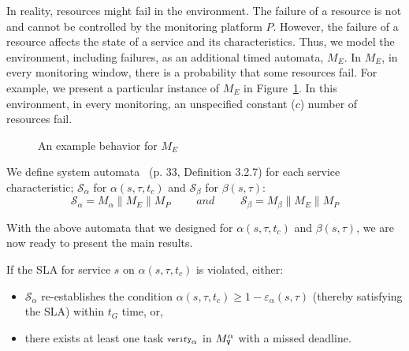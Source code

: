 In reality, resources might fail in the environment.
The failure of a resource is not and cannot be controlled by the monitoring platform $P$.
However, the failure of a resource affects the state of a service and its characteristics.
Thus, we model the environment, including failures, as an additional timed automata, $M_E$.
In $M_E$, in every monitoring window, there is a probability that some resources fail.
For example, we present a particular instance of $M_E$ in Figure~\ref{ch04:fsm:env}.
In this environment, in every monitoring, an unspecified constant ($c$) number of resources fail.

\begin{figure}[h]
\centering
{}
\caption{An example behavior for $M_E$}
\label{ch04:fsm:env}
\end{figure}

We define system automata~\cite{jaghoori2010time} (p. 33, Definition 3.2.7) for each service characteristic;
$\mathcal{S}_\alpha$ for $\alpha(s,\tau,t_c)$ and $\mathcal{S}_\beta$ for $\beta(s,\tau)$:
\[
\mathcal{S}_\alpha = M_\alpha \parallel M_E \parallel M_P
\quad\quad\textit{ and }\quad\quad
\mathcal{S}_\beta = M_\beta \parallel M_E \parallel M_P
\]

With the above automata that we designed for $\alpha(s,\tau,t_c)$ and $\beta(s,\tau)$, we are now ready to present the main results.
% 

\begin{thm}
\label{ch04:thm:alpha}
If the SLA for service $s$ on $\alpha(s,\tau,t_c)$ is violated, either:
\begin{itemize}
\item $\mathcal{S}_\alpha$ re-establishes the condition $\alpha(s,\tau,t_c) \geq 1 - \varepsilon_\alpha(s,\tau)$ (thereby satisfying the SLA) within $t_G$ time, or, 
\item there exists at least one task ${\scriptsize\texttt{verify}}_\alpha$ in $M^{\alpha}_{{\scriptsize\texttt{V}}}$ with a missed deadline.
\end{itemize}
\end{thm}

